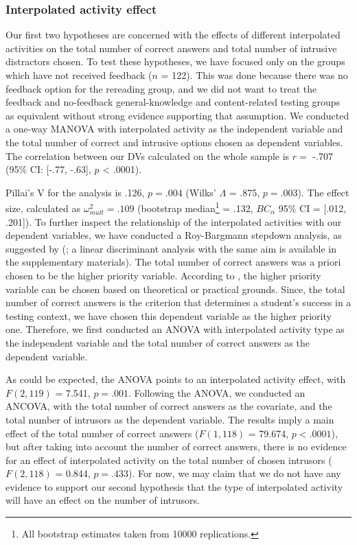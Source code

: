 \documentclass[11pt,]{article}
\let\rmarkdownfootnote\footnote%
\def\footnote{\protect\rmarkdownfootnote}
\begin{document}
\hypertarget{interpolated-activity-effect}{%
\subsubsection{Interpolated activity
effect}\label{interpolated-activity-effect}}

Our first two hypotheses are concerned with the effects of different
interpolated activities on the total number of correct answers and total
number of intrusive distractors chosen. To test these hypotheses, we
have focused only on the groups which have not received feedback (\(n\)
= 122). This was done because there was no feedback option for the
rereading group, and we did not want to treat the feedback and
no-feedback general-knowledge and content-related testing groups as
equivalent without strong evidence supporting that assumption. We
conducted a one-way MANOVA with interpolated activity as the independent
variable and the total number of correct and intrusive options chosen as
dependent variables. The correlation between our DVs calculated on the
whole sample is \(r =\) -.707 (95\% CI: {[}-.77, -.63{]}, \(p\)
\textless{} .0001).

Pillai's V for the analysis is .126, \(p = .004\) (Wilks' \(\Lambda\) =
.875, \(p = .003\)). The effect size, calculated as
\(\omega^2_{mult} = .109\) (bootstrap
median\footnote{All bootstrap estimates taken from 10000 replications.}
= .132, \(BC_\alpha\) 95\% CI = {[}.012, .201{]}). To further inspect
the relationship of the interpolated activities with our dependent
variables, we have conducted a Roy-Bargmann stepdown analysis, as
suggested by \citeauthor{tabachnickUsingMultivariateStatistics2012}
(\citeyear{tabachnickUsingMultivariateStatistics2012}; a linear
discriminant analysis with the same aim is available in the
supplementary materials). The total number of correct answers was a
priori chosen to be the higher priority variable. According to
\citet{tabachnickUsingMultivariateStatistics2012}, the higher priority
variable can be chosen based on theoretical or practical grounds. Since,
the total number of correct answers is the criterion that determines a
student's success in a testing context, we have chosen this dependent
variable as the higher priority one. Therefore, we first conducted an
ANOVA with interpolated activity type as the independent variable and
the total number of correct answers as the dependent variable.

As could be expected, the ANOVA points to an interpolated activity
effect, with \(F(2, 119)\) = 7.541, \(p = .001\). Following the ANOVA,
we conducted an ANCOVA, with the total number of correct answers as the
covariate, and the total number of intrusors as the dependent variable.
The results imply a main effect of the total number of correct answers
(\(F(1, 118)\) = 79.674, \(p < .0001\)), but after taking into account
the number of correct answers, there is no evidence for an effect of
interpolated activity on the total number of chosen intrusors
(\(F (2, 118)\) = 0.844, \(p = .433\)). For now, we may claim that we do
not have any evidence to support our second hypothesis that the type of
interpolated activity will have an effect on the number of intrusors.
\end{document}
